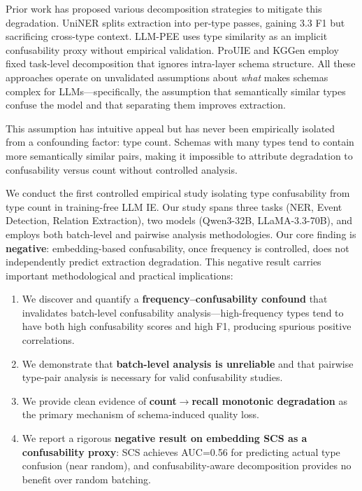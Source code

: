 \documentclass[11pt,a4paper]{article}
\begin{document}
Prior work has proposed various decomposition strategies to mitigate this degradation.
UniNER \cite{} splits extraction into per-type passes, gaining 3.3 F1 but sacrificing cross-type context.
LLM-PEE \cite{} uses type similarity as an implicit confusability proxy without empirical validation.
ProUIE \cite{} and KGGen \cite{} employ fixed task-level decomposition that ignores intra-layer schema structure.
All these approaches operate on unvalidated assumptions about \emph{what} makes schemas complex for LLMs---specifically, the assumption that semantically similar types confuse the model and that separating them improves extraction.

This assumption has intuitive appeal but has never been empirically isolated from a confounding factor: type count.
Schemas with many types tend to contain more semantically similar pairs, making it impossible to attribute degradation to confusability versus count without controlled analysis.

We conduct the first controlled empirical study isolating type confusability from type count in training-free LLM IE.
Our study spans three tasks (NER, Event Detection, Relation Extraction), two models (Qwen3-32B, LLaMA-3.3-70B), and employs both batch-level and pairwise analysis methodologies.
Our core finding is \textbf{negative}: embedding-based confusability, once frequency is controlled, does not independently predict extraction degradation.
This negative result carries important methodological and practical implications:

\begin{enumerate}
\item We discover and quantify a \textbf{frequency--confusability confound} that invalidates batch-level confusability analysis---high-frequency types tend to have both high confusability scores and high F1, producing spurious positive correlations.
\item We demonstrate that \textbf{batch-level analysis is unreliable} and that pairwise type-pair analysis is necessary for valid confusability studies.
\item We provide clean evidence of \textbf{count$\to$recall monotonic degradation} as the primary mechanism of schema-induced quality loss.
\item We report a rigorous \textbf{negative result on embedding SCS as a confusability proxy}: SCS achieves AUC=0.56 for predicting actual type confusion (near random), and confusability-aware decomposition provides no benefit over random batching.
\end{enumerate}
\end{document}
